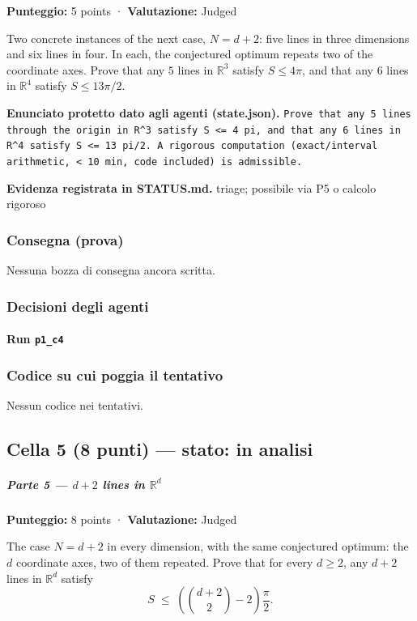 \documentclass[11pt,a4paper]{article}
\begin{document}
\textbf{Punteggio:} 5 points · \textbf{Valutazione:} Judged

Two concrete instances of the next case, \(N = d+2\): five lines in
three dimensions and six lines in four. In each, the conjectured optimum
repeats two of the coordinate axes. Prove that any \(5\) lines in
\(\mathbb{R}^3\) satisfy \(S \le 4\pi\), and that any \(6\) lines in
\(\mathbb{R}^4\) satisfy \(S \le 13\pi/2\).

\textbf{Enunciato protetto dato agli agenti (state.json).} \texttt{Prove that any 5 lines through the origin in R\textasciicircum{}3 satisfy S \textless{}= 4 pi, and that any 6 lines in R\textasciicircum{}4 satisfy S \textless{}= 13 pi/2. A rigorous computation (exact/interval arithmetic, \textless{} 10 min, code included) is admissible.}

\textbf{Evidenza registrata in STATUS.md.} triage; possibile via P5 o calcolo rigoroso

\subsubsection{Consegna (prova)}
Nessuna bozza di consegna ancora scritta.

\subsubsection{Decisioni degli agenti}
\paragraph{Run \texttt{p1\_c4}}

\subsubsection{Codice su cui poggia il tentativo}
Nessun codice nei tentativi.

\subsection{Cella 5 (8 punti) — stato: in analisi}
\subparagraph{\texorpdfstring{Parte 5 --- \(d+2\) lines in
\(\mathbb{R}^d\)}{Parte 5 --- d+2 lines in \textbackslash mathbb\{R\}\^{}d}}\label{parte-5-d2-lines-in-mathbbrd}

\textbf{Punteggio:} 8 points · \textbf{Valutazione:} Judged

The case \(N = d+2\) in every dimension, with the same conjectured
optimum: the \(d\) coordinate axes, two of them repeated. Prove that for
every \(d \ge 2\), any \(d+2\) lines in \(\mathbb{R}^d\) satisfy \[
S \;\le\; \left( \binom{d+2}{2} - 2 \right) \frac{\pi}{2}.
\]
\end{document}
